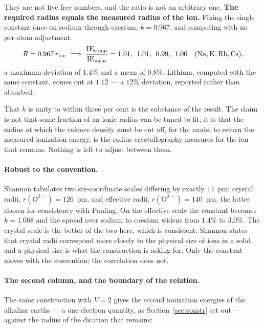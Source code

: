 \documentclass[11pt]{article}
\begin{document}
They are not five free numbers, and the ratio is not an arbitrary one.
\textbf{The required radius equals the measured radius of the ion.} Fixing the single constant
once on sodium through caesium, $k=0.967$, and computing with no per-atom adjustment:
\begin{equation}
R = 0.967\,r_{\rm ion} \;\Longrightarrow\;
\frac{\mathrm{IE_{comp}}}{\mathrm{IE_{meas}}} =
1.01,\;\, 1.01,\;\, 0.99,\;\, 1.00
\quad (\mathrm{Na},\mathrm{K},\mathrm{Rb},\mathrm{Cs}),
\label{eq:oneconst}
\end{equation}
a maximum deviation of $1.4\%$ and a mean of $0.8\%$. Lithium, computed with the same constant,
comes out at $1.12$ --- a $12\%$ deviation, reported rather than absorbed.

That $k$ is unity to within three per cent is the substance of the result. The claim is not
that some fraction of an ionic radius can be tuned to fit; it is that the radius at which the
valence density must be cut off, for the model to return the measured ionization energy, is the
radius crystallography measures for the ion that remains. Nothing is left to adjust between
them.

\paragraph{Robust to the convention.} Shannon tabulates two six-coordinate scales differing
by exactly $14$~pm: crystal radii, $r(\mathrm{O}^{2-})=126$~pm, and effective radii,
$r(\mathrm{O}^{2-})=140$~pm, the latter chosen for consistency with Pauling. On the effective
scale the constant becomes $k=1.068$ and the spread over sodium to caesium widens from $1.4\%$
to $3.0\%$. The crystal scale is the better of the two here, which is consistent: Shannon states
that crystal radii correspond more closely to the physical size of ions in a solid, and a
physical size is what the construction is asking for. Only the constant moves with the
convention; the correlation does not.

\paragraph{The second column, and the boundary of the relation.} The same construction with
$V=2$ gives the second ionization energies of the alkaline earths --- a one-electron quantity,
as Section~\ref{sec:constr} set out --- against the radius of the dication that remains:
\end{document}
